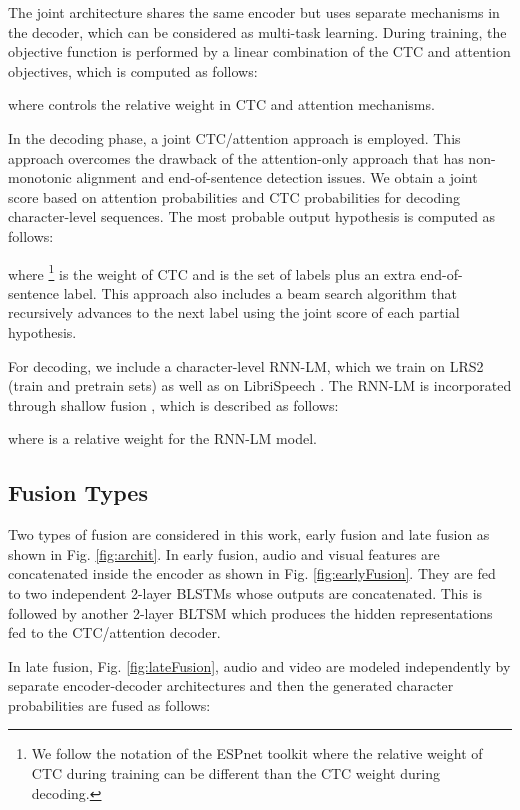 \documentclass{article}
\begin{document}
The joint architecture shares the same encoder but uses separate mechanisms in the decoder, which can be considered as multi-task learning. During training, the objective function is performed by a linear combination of the CTC and attention objectives, which is computed as follows:

where   controls the relative weight in CTC and attention mechanisms.

In the decoding phase, a joint CTC/attention approach is employed. This approach overcomes the drawback of the attention-only approach that has non-monotonic alignment and end-of-sentence detection issues. We obtain a joint score based on attention probabilities and CTC probabilities for decoding character-level sequences. The most probable output hypothesis  is computed as follows:
 
where \footnote{We follow the notation of the ESPnet toolkit\cite{espnet} where the relative weight of CTC during training can be different than the CTC weight during decoding.} is the weight of CTC and  is the set of labels plus an extra end-of-sentence label. This approach also includes a beam search algorithm that recursively advances to the next label using the joint score of each partial hypothesis. 

For decoding, we include a character-level RNN-LM, which we train on LRS2 (train and pretrain sets) as well as on LibriSpeech \cite{panayotov2015librispeech}. The RNN-LM is incorporated through shallow fusion \cite{kannan2017analysis}, which is described as follows:


where  is a relative weight for the RNN-LM model.

\subsection{Fusion Types}
Two types of fusion are considered in this work, early fusion and late fusion as shown in Fig. \ref{fig:archit}. In early fusion, audio and visual features 
are concatenated inside the encoder as shown in Fig. \ref{fig:earlyFusion}. They are fed to two independent 2-layer BLSTMs whose outputs are concatenated. This is followed by another 2-layer BLTSM which produces the hidden representations fed to the CTC/attention decoder. 

In late fusion, Fig. \ref{fig:lateFusion}, audio and video are modeled independently by separate encoder-decoder architectures and then the generated character probabilities are fused as follows: 
\end{document}
